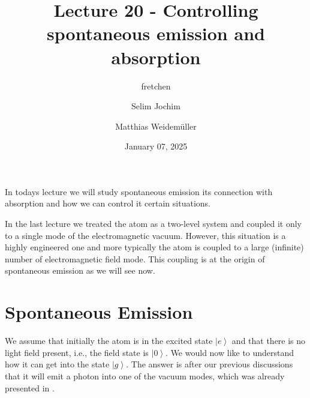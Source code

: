 \documentclass[10pt]{article}
\let\cite\citep
\renewenvironment{abstract}
  {{\bfseries\noindent{\abstractname}\par\nobreak}\footnotesize}
  {\bigskip}
\providecommand\citep{\cite}
\newcommand{\ket}[1]{\ensuremath{\left|#1\right\rangle}}
\begin{document}
\title{Lecture 20 - Controlling spontaneous emission and absorption}



\author[1]{fretchen}%
\author[2]{Selim Jochim}%
\author[2]{Matthias Weidemüller}%
%
%


\vspace{-1em}



  
  \date{January 07, 2025}


\begingroup
\let\center\flushleft
\let\endcenter\endflushleft
\maketitle
\endgroup





\begin{abstract}
In todays lecture we will study spontaneous emission its connection with absorption and how we can control it certain situations.%
\end{abstract}%



\sloppy


In the last lecture \cite{states} we treated the atom as a two-level system and coupled it only to a single mode of the electromagnetic vacuum. However, this situation is a highly engineered one and more typically the atom is coupled to a large (infinite) number of electromagnetic field mode. This coupling is at the origin of spontaneous emission as we will see now.

\section{Spontaneous Emission}

We assume that initially the atom is in the excited state $\ket{e}$ and that there is no light field present, i.e., the field state is $\ket{0}$. We would now like to understand how it can get into the state $\ket{g}$. The answer is after our previous discussions that it will emit a photon into one of the vacuum modes, which was already presented in \cite{field}. 
\end{document}
